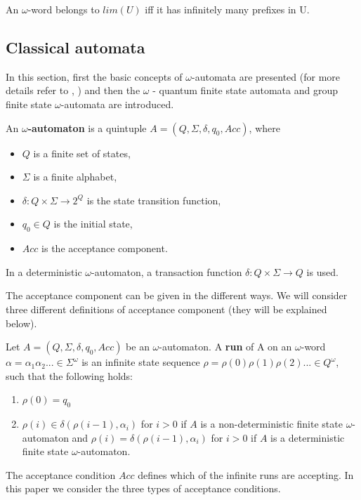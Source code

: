 \documentclass{llncs}
\begin{document}
An $\omega $-word belongs to $lim(U)$ iff it has infinitely many prefixes in U.
%
\subsection{Classical  automata}
%
In this section, first the basic concepts of $\omega$-automata are presented (for more details refer to \cite{SP02}, \cite{T97}) and then the $\omega$ - quantum finite state automata and group finite state $\omega$-automata are introduced.
%
\begin{definition}
An \textbf{$\omega$-automaton} is a quintuple $A = (Q, \Sigma, \delta, q_0, Acc)$, where
\begin{itemize}
\item $Q$ is a finite set of states,
\item $\Sigma$ is a finite alphabet,
\item $\delta : Q \times \Sigma \rightarrow 2^{Q}$ is the state transition function,
\item $q_0 \in Q$ is the initial state,
\item $Acc$ is the acceptance component. 
\end{itemize}
In a deterministic $\omega$-automaton, a transaction function $\delta : Q \times \Sigma \rightarrow Q$ is used.
\end{definition}

The acceptance component can be given in the different ways. We will consider three different definitions of acceptance component (they will be explained below). 

\begin{definition}
Let $A = (Q, \Sigma, \delta, q_0, Acc)$ be an $\omega$-automaton. A \textbf{run} of A on an $\omega$-word $\alpha = \alpha_1 \alpha_2 ... \in \Sigma^{\omega}$ is an infinite state sequence $\rho = \rho(0)\rho(1)\rho(2)... \in Q^{\omega}$, such that the following holds:
\begin{enumerate}
\item $\rho(0) = q_0$
\item $\rho(i) \in \delta(\rho (i-1), \alpha _i)$ for $i > 0$ if $A$ is a non-deterministic finite state $\omega$-automaton and $\rho(i) = \delta(\rho(i-1),\alpha_i)$ for $i > 0$ if $A$ is a deterministic finite state $\omega$-automaton.
\end{enumerate}
\end{definition}

The acceptance condition $Acc$ defines which of the infinite runs are accepting. In this paper we consider the three types of acceptance conditions.
\end{document}
